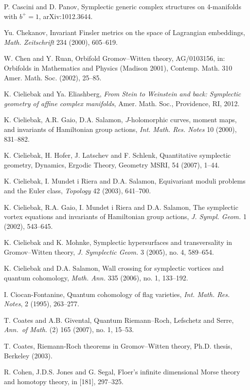  P. Cascini and D. Panov, Symplectic generic complex structures on 4-manifolds with $b^{+}=1$, arXiv:1012.3644.

 Yu. Chekanov, Invariant Finsler metrics on the space of Lagrangian embeddings, \emph{Math. Zeitschrift} 234 (2000), 605–619.

 W. Chen and Y. Ruan, Orbifold Gromov–Witten theory, AG/0103156, in: Orbifolds in Mathematics and Physics (Madison 2001), Contemp. Math. 310 Amer. Math. Soc. (2002), 25–85.

 K. Cieliebak and Ya. Eliashberg, \emph{From Stein to Weinstein and back: Symplectic geometry of affine complex manifolds}, Amer. Math. Soc., Providence, RI, 2012.

 K. Cieliebak, A.R. Gaio, D.A. Salamon, $J$-holomorphic curves, moment maps, and invariants of Hamiltonian group actions, \emph{Int. Math. Res. Notes} 10 (2000), 831–882.

 K. Cieliebak, H. Hofer, J. Latschev and F. Schlenk, Quantitative symplectic geometry, Dynamics, Ergodic Theory, Geometry MSRI, 54 (2007), 1–44.

 K. Cieliebak, I. Mundet i Riera and D.A. Salamon, Equivariant moduli problems and the Euler class, \emph{Topology} 42 (2003), 641–700.

 K. Cieliebak, R.A. Gaio, I. Mundet i Riera and D.A. Salamon, The symplectic vortex equations and invariants of Hamiltonian group actions, \emph{J. Sympl. Geom.} 1 (2002), 543–645.

 K. Cieliebak and K. Mohnke, Symplectic hypersurfaces and transversality in Gromov–Witten theory, \emph{J. Symplectic Geom.} 3 (2005), no. 4, 589–654.

 K. Cieliebak and D.A. Salamon, Wall crossing for symplectic vortices and quantum cohomology, \emph{Math. Ann.} 335 (2006), no. 1, 133–192.

 I. Ciocan-Fontanine, Quantum cohomology of flag varieties, \emph{Int. Math. Res. Notes}, 2 (1995), 263–277.

 T. Coates and A.B. Givental, Quantum Riemann–Roch, Lefschetz and Serre, \emph{Ann.\ of Math.} (2) 165 (2007), no. 1, 15–53.

 T. Coates, Riemann-Roch theorems in Gromov–Witten theory, Ph.D. thesis, Berkeley (2003).

 R. Cohen, J.D.S. Jones and G. Segal, Floer’s infinite dimensional Morse theory and homotopy theory, in [181], 297–325.

